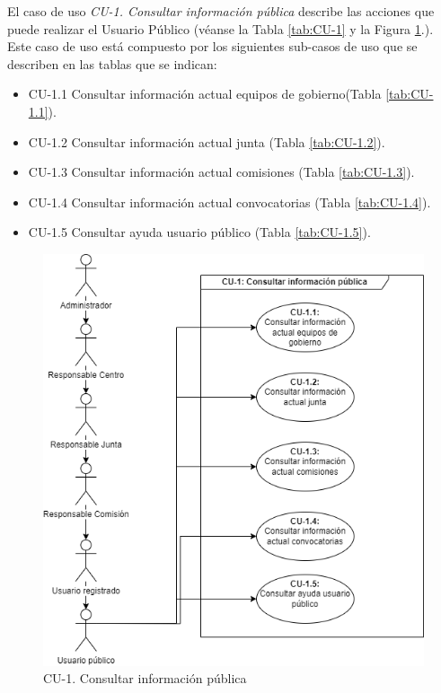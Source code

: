 El caso de uso \textit{CU-1. Consultar información pública} describe las acciones que puede realizar el Usuario Público (véanse la Tabla \ref{tab:CU-1} y la Figura \ref{fig:Diagrama-Caso de uso 1. Consultar información pública}.). Este caso de uso está compuesto por los siguientes sub-casos de uso que se describen en las tablas que se indican:
\begin{itemize}
    \item CU-1.1 Consultar información actual equipos de gobierno(Tabla \ref{tab:CU-1.1}).
    \item CU-1.2 Consultar información actual junta (Tabla \ref{tab:CU-1.2}).
    \item CU-1.3 Consultar información actual comisiones (Tabla \ref{tab:CU-1.3}).
    \item CU-1.4 Consultar información actual convocatorias (Tabla \ref{tab:CU-1.4}).
    \item CU-1.5 Consultar ayuda usuario público (Tabla \ref{tab:CU-1.5}).
\end{itemize}

\begin{figure}[H]
\centering
\includegraphics[scale=0.75]{img/diagramas/Funcional/CU-1.png}
\caption{CU-1. Consultar información pública}\label{fig:Diagrama-Caso de uso 1. Consultar información pública}   
\end{figure}

